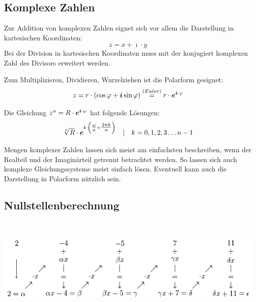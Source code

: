 	\subsection{Komplexe Zahlen}
		\begin{multicols}{2}
			\begin{hint}
				Zur Addition von komplexen Zahlen eignet sich vor allem die Darstellung in kartesischen Koordinaten: 
				$$ z = x + \imath \cdot y$$
				Bei der Division in kartesischen Koordinaten muss mit der konjugiert komplexen Zahl des Divisors erweitert werden. 
			\end{hint}
			\begin{hint}[Polarform]
				Zum Multiplizieren, Dividieren, Wurzelziehen ist die Polarform geeignet:
				$$ z = r \cdot (\cos \varphi + \boldsymbol{i} \sin \varphi ) \overset{(Euler)}{=} r \cdot \boldsymbol{e}^{\boldsymbol{i} \cdot \varphi}$$
			\end{hint}
			\begin{hint}[Wurzeln]
				Die Gleichung $z^n = R \cdot \boldsymbol{e}^{\boldsymbol{i} \cdot \omega}$ hat folgende Lösungen:
				$$
				\sqrt[n]{R} \cdot \boldsymbol{e}^{\boldsymbol{i} \cdot \left(\tfrac{\omega}{n} + \tfrac{2 \pi k}{n} \right)} \quad \vert \quad k = 0, 1, 2, 3 \dots n - 1
				$$
			\end{hint}
			\begin{hint}
				Mengen komplexer Zahlen lassen sich meist am einfachsten beschreiben, wenn der Realteil und der Imaginärteil getrennt betrachtet werden. So lassen sich auch komplexe Gleichungssysteme meist einfach lösen. 
				Eventuell kann auch die Darstellung in Polarform nützlich sein.
			\end{hint}
		\end{multicols}
		
	\subsection{Nullstellenberechnung}
		\begin{hint}[Hornerschema]\hfill\\
			\begin{center}
			\includegraphics[scale=0.7]{./Images/Hornerschema.png}
			\end{center}
		\end{hint}